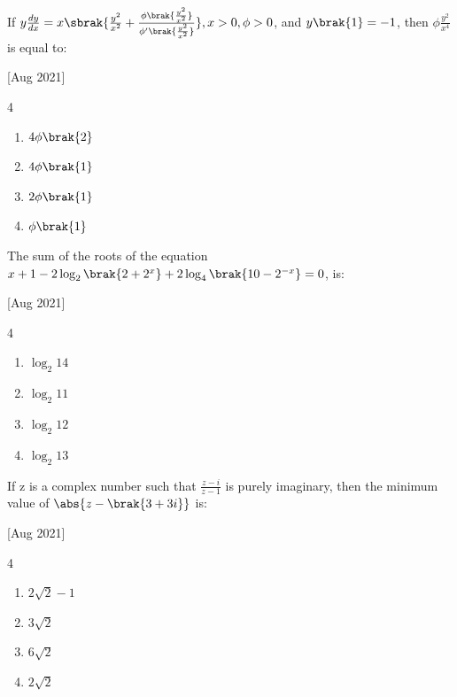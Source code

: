     \item If $y\frac{dy}{dx}=x\sbrak{\frac{y^2}{x^2}+\frac{\phi\brak{\frac{y^2}{x^2}}}{\phi'\brak{\frac{y^2}{x^2}}}},x>0,\phi>0$, and $y\brak{1}=-1$, then $\phi\frac{y^2}{x^4}$ is equal to:
    
    \hfill{[Aug 2021]}

        \begin{multicols}{4}
            \begin{enumerate}
                \item $4\phi\brak{2}$
                \item $4\phi\brak{1}$
                \item $2\phi\brak{1}$
                \item $\phi\brak{1}$
            \end{enumerate}
        \end{multicols}
        
    \item The sum of the roots of the equation $x+1-2\log_2\brak{2+2^x}+2\log_4\brak{10-2^{-x}}=0$, is:
    
    \hfill{[Aug 2021]}

        \begin{multicols}{4}
            \begin{enumerate}
                \item $\log_2 14$
                \item $\log_2 11$
                \item $\log_2 12$
                \item $\log_2 13$
            \end{enumerate}
        \end{multicols}

    \item If z is a complex number such that $\frac{z-i}{z-1}$ is purely imaginary, then the minimum value of $\abs{z-\brak{3+3i}}$ is:
    
    \hfill{[Aug 2021]}

        \begin{multicols}{4}
            \begin{enumerate}
                \item $2\sqrt{2}-1$
                \item $3\sqrt{2}$
                \item $6\sqrt{2}$
                \item $2\sqrt{2}$
            \end{enumerate}
        \end{multicols}


